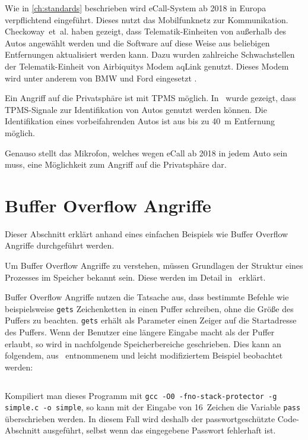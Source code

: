 Wie in \cref{ch:standards} beschrieben wird eCall-System ab 2018 in Europa
verpflichtend eingeführt. Dieses nutzt das Mobilfunknetz zur Kommunikation.
Checkoway~et~al. haben gezeigt, dass Telematik-Einheiten von außerhalb des
Autos angewählt werden und die Software auf diese Weise aus beliebigen
Entfernungen aktualisiert werden kann. Dazu wurden zahlreiche Schwachstellen
der Telematik-Einheit von Airbiquitys Modem aqLink genutzt. Dieses Modem wird
unter anderem von BMW und Ford eingesetzt \cite{AirbiquityBMW,AirbiquityFord}.

Ein Angriff auf die Privatsphäre ist mit TPMS möglich. In~\cite{Rouf2010} wurde
gezeigt, dass TPMS-Signale zur Identifikation von Autos genutzt werden können.
Die Identifikation eines vorbeifahrenden Autos ist aus bis zu \SI{40}{\meter}
Entfernung möglich.

Genauso stellt das Mikrofon, welches wegen eCall ab 2018 in jedem Auto sein
muss, eine Möglichkeit zum Angriff auf die Privatsphäre dar.


\section{Buffer Overflow Angriffe}\label{sec:Buffer-Overflow}
Dieser Abschnitt erklärt anhand eines einfachen Beispiels wie Buffer Overflow
Angriffe durchgeführt werden.

Um Buffer Overflow Angriffe zu verstehen, müssen Grundlagen der Struktur eines
Prozesses im Speicher bekannt sein. Diese werden im Detail
in~\cite{Silberschatz2005} erklärt.

Buffer Overflow Angriffe nutzen die Tatsache aus, dass bestimmte Befehle wie
beispielsweise \verb+gets+ Zeichenketten in einen Puffer schreiben, ohne die Größe
des Puffers zu beachten. \verb+gets+ erhält als Parameter einen Zeiger auf die
Startadresse des Puffers. Wenn der Benutzer eine längere Eingabe macht als der
Puffer erlaubt, so wird in nachfolgende Speicherbereiche geschrieben. Dies kann
an folgendem, aus~\cite{Arora2013} entnommenem und leicht modifiziertem
Beispiel beobachtet werden:

\inputminted[linenos, numbersep=5pt, tabsize=4, frame=lines, label=simple.c]{c}{content/exploit-buffer-overflow/simple.c}

Kompiliert man dieses Programm mit
\verb+gcc -O0 -fno-stack-protector -g simple.c -o simple+, so kann mit der
Eingabe von 16~Zeichen die Variable \verb+pass+ überschrieben werden. In diesem
Fall wird deshalb der passwortgeschützte Code-Abschnitt ausgeführt, selbst
wenn das eingegebene Passwort fehlerhaft ist.

